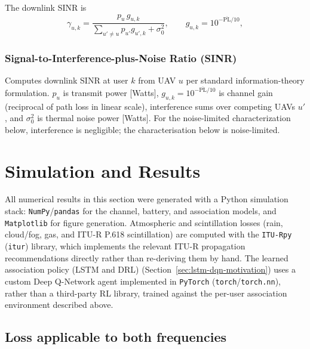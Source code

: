 \documentclass[conference]{IEEEtran}
\begin{document}
The downlink SINR is
\begin{equation}
\gamma_{u,k} = \frac{p_u\,g_{u,k}}{\sum_{u'\neq u} p_{u'} g_{u',k} + \sigma_0^2},
\qquad g_{u,k}=10^{-\overline{\mathrm{PL}}/10},
\label{eq:sinr}
\end{equation}

\subsubsection{Signal-to-Interference-plus-Noise Ratio (SINR)}
Computes downlink SINR at user $k$ from UAV $u$ per standard information-theory formulation. $p_u$ is transmit power [Watts], $g_{u,k}=10^{-\overline{\mathrm{PL}}/10}$ is channel gain (reciprocal of path loss in linear scale), interference sums over competing UAVs $u'$, and $\sigma_0^2$ is thermal noise power [Watts]. For the noise-limited characterization below, interference is negligible; the characterisation below is
noise-limited.

\section{Simulation and Results}

All numerical results in this section were generated with a Python simulation
stack: \texttt{NumPy}/\texttt{pandas} for the channel, battery, and association
models, and \texttt{Matplotlib} for figure generation. Atmospheric and
scintillation losses (rain, cloud/fog, gas, and ITU-R P.618 scintillation) are
computed with the \texttt{ITU-Rpy} (\texttt{itur}) library, which implements the
relevant ITU-R propagation recommendations directly rather than re-deriving
them by hand. The learned association policy (LSTM and DRL) (Section~\ref{sec:lstm-dqn-motivation})
uses a custom Deep Q-Network agent implemented in \texttt{PyTorch}
(\texttt{torch}/\texttt{torch.nn}), rather than a third-party RL library, trained
against the per-user association environment described above.

\subsection{Loss applicable to both frequencies}
\end{document}
